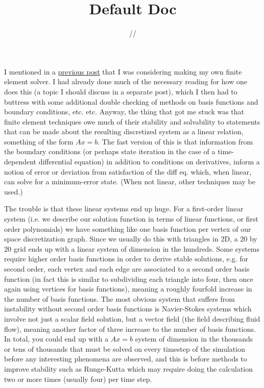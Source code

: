 \documentclass[11pt]{article}
\title{\textbf{Default Doc}}
\date{\the\day/\the\month/\the\year}
\begin{document}

I mentioned in a \hyperlink{https://clockssugars.blog/articles/0126-heateq/}{previous post} that I was considering making my own finite element solver. I had already done much of the necessary reading for how one does this (a topic I should discuss in a separate post), which I then had to buttress with some additional double checking of methods on basis functions and boundary conditions, etc. etc. Anyway, the thing that got me stuck was that finite element techniques owe much of their stability and solvability to statements that can be made about the resulting discretized system as a linear relation, something of the form $Ax = b$. The fast version of this is that information from the boundary conditions (or perhaps state iteration in the case of a time-dependent differential equation) in addition to conditions on derivatives, inform a notion of error or deviation from satisfaction of the diff eq. which, when linear, can solve for a minimum-error state. (When not linear, other techniques may be used.)

The trouble is that these linear systems end up huge. For a first-order linear system (i.e. we describe our solution function in terms of linear functions, or first order polynomials) we have something like one basis function per vertex of our space discretization graph. Since we usually do this with triangles in 2D, a 20 by 20 grid ends up with a linear system of dimension in the hundreds. Some systems require higher order basis functions in order to derive stable solutions, e.g. for second order, each vertex and each edge are associated to a second order basis function (in fact this is similar to subdividing each triangle into four, then once again using vertices for basis functions), meaning a roughly fourfold increase in the number of basis functions. The most obvious system that suffers from instability without second order basis functions is Navier-Stokes systems which involve not just a scalar field solution, but a vector field (the field describing fluid flow), meaning another factor of three increase to the number of basis functions. In total, you could end up with a $Ax=b$ system of dimension in the thousands or tens of thousands that must be solved on every timestep of the simulation before any interesting phenomena are observed, and this is before methods to improve stability such as Runge-Kutta which may require doing the calculation two or more times (usually four) per time step.
\end{document}
